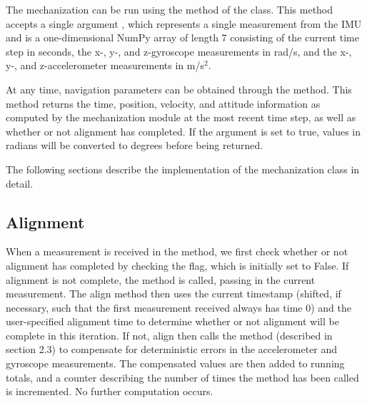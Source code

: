 \documentclass[11pt, oneside]{article}   	%
\begin{document}
The mechanization can be run using the  method of the  class.  This method accepts a single argument , which represents a single measurement from the IMU and is a one-dimensional NumPy array of length 7 consisting of the current time step in seconds, the x-, y-, and z-gyroscope measurements in rad/s, and the x-, y-, and z-accelerometer measurements in m/s$^2$.  

At any time, navigation parameters can be obtained through the  method.  This method returns the time, position, velocity, and attitude information as computed by the mechanization module at the most recent time step, as well as whether or not alignment has completed.  If the argument  is set to true, values in radians will be converted to degrees before being returned.

The following sections describe the implementation of the mechanization class in detail.

\subsection{Alignment}
When a measurement is received in the  method, we first check whether or not alignment has completed by checking the  flag, which is initially set to False.  If alignment is not complete, the  method is called, passing in the current measurement.  The align method then uses the current timestamp (shifted, if necessary, such that the first measurement received always has time 0) and the user-specified alignment time to determine whether or not alignment will be complete in this iteration.  If not, align then calls the  method (described in section 2.3) to compensate for deterministic errors in the accelerometer and gyroscope measurements.  The compensated values are then added to running totals, and a counter describing the number of times the  method has been called is incremented.  No further computation occurs.
\end{document}
